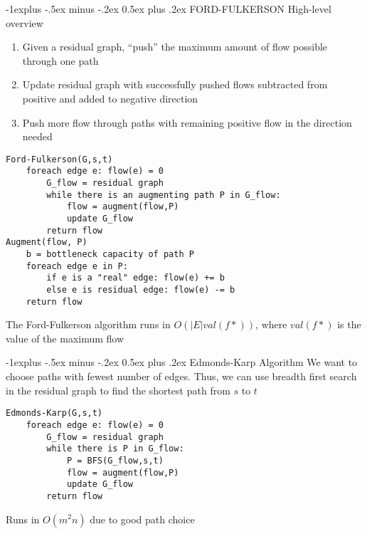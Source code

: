 \documentclass[letterpaper, 8pt]{extarticle}
\makeatletter
\renewcommand{\subsection}{\@startsection{subsection}{2}{0mm}%
                                {-1explus -.5ex minus -.2ex}%
                                {0.5ex plus .2ex}%
                                {\normalfont\small\bfseries}}
\makeatother
\begin{document}
\begin{multicols*}{5}
\subsection{FORD-FULKERSON}
High-level overview
\begin{enumerate}
    \item Given a residual graph, ``push'' the maximum amount of flow possible through one path
    \item Update residual graph with successfully pushed flows subtracted from positive and added to negative direction
    \item Push more flow through paths with remaining positive flow in the direction needed 
\end{enumerate}
\begin{lstlisting}
Ford-Fulkerson(G,s,t)
    foreach edge e: flow(e) = 0
        G_flow = residual graph
        while there is an augmenting path P in G_flow:
            flow = augment(flow,P)
            update G_flow
        return flow
Augment(flow, P)
    b = bottleneck capacity of path P
    foreach edge e in P:
        if e is a "real" edge: flow(e) += b
        else e is residual edge: flow(e) -= b
    return flow
\end{lstlisting}
The Ford-Fulkerson algorithm runs in $O(|E| val(f*))$, where $val(f*)$ is the value of the maximum flow

\subsection{Edmonds-Karp Algorithm}
We want to choose paths with fewest number of edges. Thus, we can use breadth first search in the residual graph to find the shortest path from $s$ to $t$
\begin{lstlisting}
Edmonds-Karp(G,s,t)
    foreach edge e: flow(e) = 0
        G_flow = residual graph
        while there is P in G_flow:
            P = BFS(G_flow,s,t)
            flow = augment(flow,P)
            update G_flow
        return flow
\end{lstlisting}
Runs in $O(m^2n)$ due to good path choice



\end{multicols*}
\end{document}
